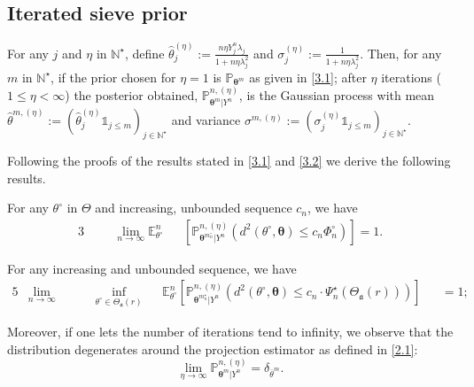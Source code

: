 \subsection{Iterated sieve prior}\label{4.2}

For any $j$ and $\eta$ in $\mathds{N}^{\star}$, define $\widehat{\theta}^{(\eta)}_{j} := \frac{n \eta Y^{n}_{j} \lambda_{j}}{1 + n \eta \lambda_{j}^{2}}$ and $\sigma^{(\eta)}_{j} := \frac{1}{1 + n \eta \lambda_{j}^{2}}$.
Then, for any $m$ in $\mathds{N}^{\star}$, if the prior chosen for $\eta=1$ is $\mathds{P}_{\boldsymbol{\theta}^{m}}$ as given in \textsc{\cref{3.1}}; after $\eta$ iterations ($1 \leq \eta < \infty$) the posterior obtained, $\mathds{P}_{\boldsymbol{\theta}^{m} \vert Y^{n}}^{n, (\eta)}$, is the Gaussian process with mean $\widehat{\theta}^{m, (\eta)} := \left( \widehat{\theta}^{(\eta)}_{j} \mathds{1}_{j \leq m} \right)_{j \in \mathds{N}^{\star}}$ and variance $\sigma^{m, (\eta)} := \left( \sigma^{(\eta)}_{j} \mathds{1}_{j \leq m} \right)_{j \in \mathds{N}^{\star}}$.

\medskip

Following the proofs of the results stated in \textsc{\cref{3.1}} and \textsc{\cref{3.2}} we derive the following results.

\begin{cor}\label{cor1}
For any $\theta^{\circ}$ in $\Theta$ and increasing, unbounded sequence $c_{n}$, we have
\begin{alignat*}{3}
& && \lim\limits_{n \rightarrow \infty} \mathds{E}_{\theta^{\circ}}^{n}&&\left[\mathds{P}_{\boldsymbol{\theta}^{m_{n}^{\circ}}\vert Y^{n}}^{n, (\eta)}\left(d^{2}\left(\theta^{\circ}, \boldsymbol{\theta}\right) \leq c_{n} \Phi_{n}^{\circ} \right)\right] = 1.
\end{alignat*}
\end{cor}

\begin{cor}\label{cor2}
For any increasing and unbounded sequence, we have
\begin{alignat*}{5}
& \lim_{n \rightarrow \infty}&& && \inf\limits_{\theta^{\circ} \in \Theta_{\mathfrak{a}}(r)} && \mathds{E}_{\theta^{\circ}}^{n}\left[\mathds{P}_{\boldsymbol{\theta}^{m_{n}^{\star}}\vert Y^{n}}^{n, (\eta)}\left(d^{2}\left(\theta^{\circ}, \boldsymbol{\theta}\right) \leq c_{n} \cdot \Psi^{\star}_{n}(\Theta_{\mathfrak{a}}(r)) \right)\right]&& = 1;
\end{alignat*}
\end{cor}

Moreover, if one lets the number of iterations tend to infinity, we observe that the distribution degenerates around the projection estimator as defined in \textsc{\cref{2.1}}:
\[\lim\limits_{\eta \rightarrow \infty} \mathds{P}_{\boldsymbol{\theta}^{m} \vert Y^{n}}^{n, (\eta)} = \delta_{\overline{\theta}^{m}}.\]


